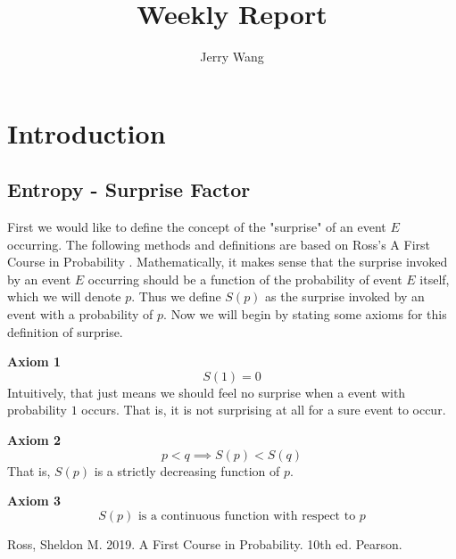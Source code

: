 \documentclass{article}
\title{Weekly Report}
\author{Jerry Wang}
\date{ }
\begin{document}
\maketitle

\tableofcontents
\newpage
\section{Introduction}
\subsection{Entropy - Surprise Factor}
First we would like to define the concept of the "surprise" of an event $E$ occurring. The following methods and definitions are based on Ross's A First Course in Probability \cite{b1}. Mathematically, it makes sense that the surprise invoked by an event $E$ occurring should be a function of the probability of event $E$ itself, which we will denote $p$.
Thus we define $S(p)$ as the surprise invoked by an event with a probability of $p$. 
Now we will begin by stating some axioms for this definition of surprise.

\textbf{Axiom 1}
\[S(1) = 0\]
Intuitively, that just means we should feel no surprise when a event with probability $1$ occurs. That is, it is not surprising at all for a sure event to occur.

\textbf{Axiom 2}
\[
p<q \implies S(p)<S(q)
\]
That is, $S(p)$ is a strictly decreasing function of $p$.

\textbf{Axiom 3}
\[
S(p) \text{ is a continuous function with respect to $p$}
\]

\newpage
\begin{thebibliography}{00}
 Ross, Sheldon M. 2019. A First Course in Probability. 10th ed. Pearson.
\end{thebibliography}
\end{document}
